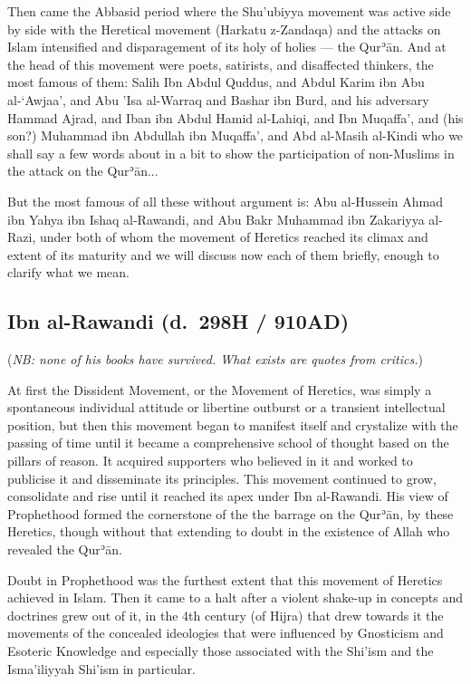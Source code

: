 \documentclass[12pt]{book}
\def \Quran{Qurʾān} %
\newcommand{\NB}[1]{\emph{\small NB: #1}}
\begin{document}
Then came the Abbasid period where the Shu’ubiyya movement was active side by
side with the Heretical movement (Harkatu z-Zandaqa) and the attacks on Islam
intensified and disparagement of its holy of holies — the \Quran. And at the
head of this movement were poets, satirists, and disaffected thinkers, the most
famous of them: Salih Ibn Abdul Quddus, and Abdul Karim ibn Abu al-‘Awjaa’, and
Abu ’Isa al-Warraq and Bashar ibn Burd, and his adversary Hammad Ajrad, and
Iban ibn Abdul Hamid al-Lahiqi, and Ibn Muqaffa’, and (his son?) Muhammad ibn
Abdullah ibn Muqaffa’, and Abd al-Masih al-Kindi who we shall say a few words
about in a bit to show the participation of non-Muslims in the attack on the
\Quran...

But the most famous of all these without argument is: Abu al-Hussein Ahmad ibn
Yahya ibn Ishaq al-Rawandi, and Abu Bakr Muhammad ibn Zakariyya al-Razi, under
both of whom the movement of Heretics reached its climax and extent of its
maturity and we will discuss now each of them briefly, enough to clarify what
we mean.


\subsection{Ibn al-Rawandi (d.\ 298H / 910AD)}

(\NB{none of his books have survived. What exists are quotes from critics.})

At first the Dissident Movement, or the Movement of Heretics, was simply a
spontaneous individual attitude or libertine outburst or a transient
intellectual position, but then this movement began to manifest itself and
crystalize with the passing of time until it became a comprehensive school of
thought based on the pillars of reason. It acquired supporters who believed in
it and worked to publicise it and disseminate its principles. This movement
continued to grow, consolidate and rise until it reached its apex under Ibn
al-Rawandi. His view of Prophethood formed the cornerstone of the the barrage
on the \Quran, by these Heretics, though without that extending to doubt in the
existence of Allah who revealed the \Quran.

Doubt in Prophethood was the furthest extent that this movement of Heretics
achieved in Islam. Then it came to a halt after a violent shake-up in concepts
and doctrines grew out of it, in the 4th century (of Hijra) that drew towards
it the movements of the concealed ideologies that were influenced by Gnosticism
and Esoteric Knowledge and especially those associated with the Shi’ism and the
Isma’iliyyah Shi’ism in particular.
\end{document}

